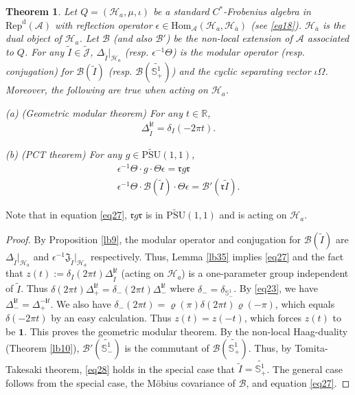 \documentclass[12pt,a4paper]{article}
\theoremstyle{definition}
\theoremstyle{plain}
\newtheorem{thm}[df]{Theorem}
\newcommand{\fk}{\mathfrak}
\newcommand{\mc}{\mathcal}
\newcommand{\wtd}{\widetilde}
\newcommand{\ovl}{\overline}
\newcommand{\id}{\mathbf{1}}
\newcommand{\Hom}{\mathrm{Hom}}
\newcommand{\UPSU}{\widetilde{\mathrm{PSU}}(1,1)}
\newcommand{\Jtd}{\widetilde{\mathcal J}}
\newcommand{\im}{\mathbf{i}}
\newcommand{\RepdA}{\mathrm{Rep}^{\mathrm d}(\mc A)}
\newcommand{\mbb}{\mathbb}
\numberwithin{equation}{section}
\begin{document}
\begin{thm}\label{lb13}
Let $Q=(\mc H_a,\mu,\iota)$ be a standard $C^*$-Frobenius algebra in $\RepdA$ with reflection operator $\epsilon\in\Hom_{\mc A}(\mc H_a,\mc H_{\ovl a})$   (see \eqref{eq18}). $\mc H_{\ovl a}$ is the dual object of $\mc H_a$. Let $\mc B$ (and also $\mc B'$) be the non-local extension of $\mc A$ associated to $Q$. For any $\wtd I\in\Jtd$, $\Delta_{\wtd I}|_{\mc H_a}$ (resp. $\epsilon^{-1}\Theta$) is the modular operator (resp. conjugation) for $\mc B(\wtd I)$ (resp. $\mc B(\wtd{\mbb S_+^1})$) and the cyclic separating vector $\iota\Omega$. Moreover, the following are true when acting on $\mc H_a$.

(a) (Geometric modular theorem) For any $t\in\mathbb R$,
\begin{align}
\Delta_{\wtd I}^{\im t}=\delta_I(-2\pi t).\label{eq26}
\end{align}

(b) (PCT theorem) For any $g\in\UPSU$,
\begin{gather}
\epsilon^{-1}\Theta \cdot g \cdot\Theta\epsilon=\fk r g\fk r\label{eq27}\\
\epsilon^{-1}\Theta\cdot\mc B(\wtd I)\cdot\Theta\epsilon=\mc B'(\fk r\wtd I). \label{eq28}
\end{gather}
\end{thm}
Note that in equation \eqref{eq27}, $\fk r g\fk r$ is in $\UPSU$ and is acting on $\mc H_a$.
\begin{proof}
By Proposition \ref{lb9}, the modular operator and conjugation for $\mc B(\wtd I)$ are $\Delta_{\wtd I}|_{\mc H_a}$ and $\epsilon^{-1}\fk J_{\wtd I}|_{\mc H_a}$ respectively.	Thus,  Lemma \ref{lb35} implies \eqref{eq27} and the fact that	$z(t):=\delta_I(2\pi t)\Delta_{\wtd I}^{\im t}$ (acting on $\mc H_a$) is a one-parameter group independent of $\wtd I$. Thus $\delta(2\pi t)\Delta_{+}^{\im t}=\delta_{-}(2\pi t)\Delta_{-}^{\im t}$ where $\delta_-=\delta_{\mbb S^1_-}$. By \eqref{eq23}, we have $\Delta_{-}^{\im t}=\Delta_{+}^{-\im t}$. We also have $\delta_-(2\pi t)=\varrho(\pi)\delta(2\pi t)\varrho(-\pi)$, which equals $\delta(-2\pi t)$ by an easy calculation. Thus $z(t)=z(-t)$, which forces $z(t)$ to be $\id$. This proves the geometric modular theorem. By the non-local Haag-duality (Theorem \ref{lb10}), $\mc B'(\wtd{\mbb S^1_-})$ is the commutant of $\mc B(\wtd{\mbb S^1_+})$. Thus, by Tomita-Takesaki theorem, \eqref{eq28} holds in the special case that $\wtd I=\wtd{\mbb S^1_+}$. The general case follows from the special case, the M\"obius covariance of $\mc B$, and equation \eqref{eq27}.
\end{proof}	
\end{document}
